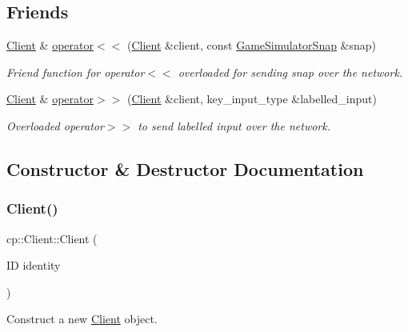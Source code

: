 \subsection*{Friends}
\begin{DoxyCompactItemize}
\item 
\hyperlink{classcp_1_1_client}{Client} \& \hyperlink{classcp_1_1_client_a5be004df779610d45f3ab82b8d869d19}{operator$<$$<$} (\hyperlink{classcp_1_1_client}{Client} \&client, const \hyperlink{classcp_1_1_game_simulator_snap}{Game\+Simulator\+Snap} \&snap)
\begin{DoxyCompactList}\small\item\em Friend function for operator$<$$<$ overloaded for sending snap over the network. \end{DoxyCompactList}\item 
\hyperlink{classcp_1_1_client}{Client} \& \hyperlink{classcp_1_1_client_a5ad18fedde7ea3af7df0b681df49ab3d}{operator$>$$>$} (\hyperlink{classcp_1_1_client}{Client} \&client, key\+\_\+input\+\_\+type \&labelled\+\_\+input)
\begin{DoxyCompactList}\small\item\em Overloaded operator$>$$>$ to send labelled input over the network. \end{DoxyCompactList}\end{DoxyCompactItemize}


\subsection{Constructor \& Destructor Documentation}
\mbox{\label{classcp_1_1_client_ae0c68ae53a2bb2ce6b2d90ee751ce2a2}} 
\subsubsection{\texorpdfstring{Client()}{Client()}}
{\footnotesize\ttfamily cp\+::\+Client\+::\+Client (\begin{DoxyParamCaption}\item[{ID}]{identity }\end{DoxyParamCaption})\hspace{0.3cm}{\ttfamily [inline]}}



Construct a new \hyperlink{classcp_1_1_client}{Client} object. 


